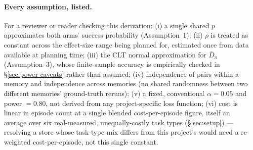 \paragraph{Every assumption, listed.} For a reviewer or reader checking this
derivation: (i) a single shared $p$ approximates both arms' success
probability (Assumption~1); (ii) $\rho$ is treated as constant across the
effect-size range being planned for, estimated once from data available at
planning time; (iii) the CLT normal approximation for $\bar D_n$
(Assumption~3), whose finite-sample accuracy is empirically checked in
\S\ref{sec:power-caveats} rather than assumed; (iv) independence of pairs
within a memory and independence across memories (no shared randomness
between two different memories' ground-truth reruns); (v) a fixed,
conventional $\alpha=0.05$ and power $=0.80$, not derived from any
project-specific loss function; (vi) cost is linear in episode count at a
single blended cost-per-episode figure, itself an average over six
real-measured, unequally-costly task types (\S\ref{sec:setup}) — resolving
a store whose task-type mix differs from this project's would need a
re-weighted cost-per-episode, not this single constant.
